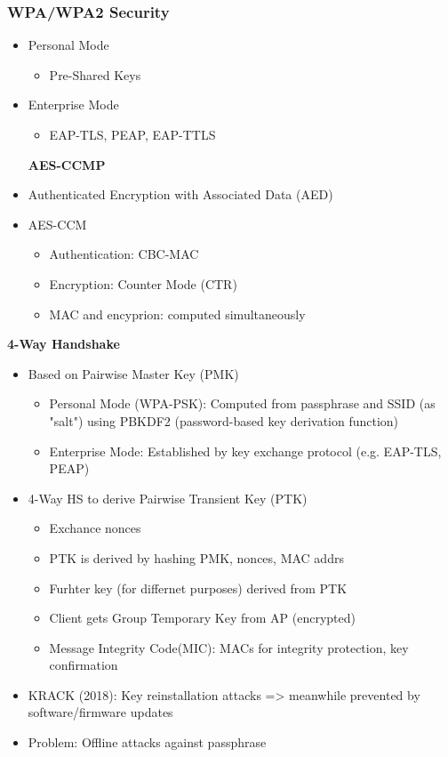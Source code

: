 \subsubsection{WPA/WPA2 Security}
\begin{itemize}
  \item Personal Mode
    \begin{itemize}
      \item Pre-Shared Keys
    \end{itemize}
  \item Enterprise Mode 
    \begin{itemize}
      \item EAP-TLS, PEAP, EAP-TTLS
    \end{itemize}

\textbf{AES-CCMP}\\
  \item Authenticated Encryption with Associated Data (AED)
  \item AES-CCM
    \begin{itemize}
      \item Authentication: CBC-MAC
      \item Encryption: Counter Mode (CTR)
      \item MAC and encyprion: computed simultaneously
    \end{itemize}
\end{itemize}

\textbf{4-Way Handshake}\\
\begin{itemize}
  \item Based on Pairwise Master Key (PMK)
    \begin{itemize}
      \item Personal Mode (WPA-PSK):
        Computed from passphrase and SSID (as "salt") using PBKDF2 (password-based key derivation function)
      \item Enterprise Mode: Established by key exchange protocol (e.g. EAP-TLS, PEAP)
    \end{itemize}
  \item 4-Way HS to derive Pairwise Transient Key (PTK) 
    \begin{itemize}
      \item Exchance nonces
      \item PTK is derived by hashing PMK, nonces, MAC addrs 
      \item Furhter key (for differnet purposes) derived from PTK 
      \item Client gets Group Temporary Key from AP (encrypted) 
      \item Message Integrity Code(MIC): MACs for integrity protection, key confirmation 
    \end{itemize}
  \item KRACK (2018): Key reinstallation attacks => meanwhile prevented by software/firmware updates 
  \item Problem: Offline attacks against passphrase 
\end{itemize}

